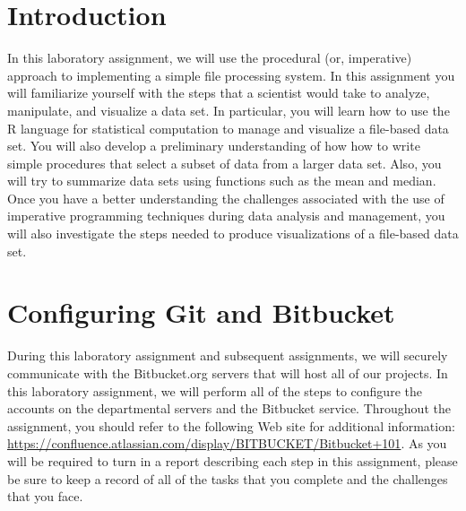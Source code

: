 


\usepackage[compact]{titlesec}



\section*{Introduction}

In this laboratory assignment, we will use the procedural (or, imperative) approach to implementing a simple file
processing system.  In this assignment you will familiarize yourself with the steps that a scientist would take to
analyze, manipulate, and visualize a data set. In particular, you will learn how to use the R language for statistical
computation to manage and visualize a file-based data set. You will also develop a preliminary understanding of how how
to write simple procedures that select a subset of data from a larger data set. Also, you will try to summarize data
sets using functions such as the mean and median. Once you have a better understanding the challenges associated with
the use of imperative programming techniques during data analysis and management, you will also investigate the steps
needed to produce visualizations of a file-based data set.

\section*{Configuring Git and Bitbucket}

During this laboratory assignment and subsequent assignments, we will securely communicate with the Bitbucket.org
servers that will host all of our projects.  In this laboratory assignment, we will perform all of the steps to
configure the accounts on the departmental servers and the Bitbucket service.  Throughout the assignment, you should
refer to the following Web site for additional information:
\url{https://confluence.atlassian.com/display/BITBUCKET/Bitbucket+101}.  As you will be required to turn in a report
describing each step in this assignment, please be sure to keep a record of all of the tasks that you complete and the
challenges that you face.

